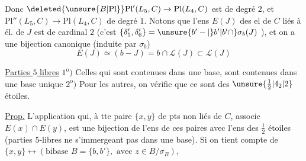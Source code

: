 Donc $\deleted{\unsure{B|\mathrm{Pl}}}\mathrm{Pl}'(L_5,C)\to\mathrm{Pl}(L_4,C)$ est de degré $2$, et $\mathrm{Pl}''(L_5,C)\to\mathrm{Pl}(L_4,C)$ de degré $1$. Notons que l'ens $E(J)$ des el de $C$ liés à  él. de $J$ est de cardinal $2$ (c'est $\{\delta'_5,\delta'_6\}=\unsure{b'-|\}b'|b'\cap}\sigma_b(J)$ ), et on a une bijection canonique (induite par $\sigma_b$)
\[
E(J)\simeq (b-\!J)=b\cap \mathscr L(J)\subset \mathscr L(J)
\]

\uline{Parties $5$ libres} $1^{\mathrm o})$ Celles qui sont contenues dans une base, sont contenues dans une base unique
$2^{\mathrm o})$ Pour les autres, on vérifie que ce sont des $\unsure{\frac12|4_2|2}$ étoiles.

\uline{Prop.} L'application qui, à tte paire $\{x,y\}$ de pts non liés de $C$, associe $E(x)\cap E(y)$, est une bijection de l'ens de ces paires avec l'ens des $\frac12$ étoiles (parties $5$-libres ne s'immergeant pas dans une base).  Si on tient compte de $\{x,y\}\longleftrightarrow(\text{bibase }B=\{b,b'\},\text{ avec }z\in B/\sigma_B)$,
